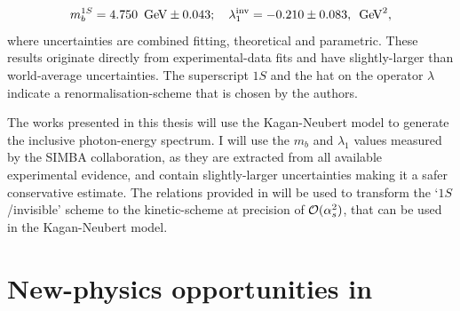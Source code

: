 \begin{equation}
    m_b^{1S} =4.750~\mathrm{\,Ge\kern -0.1em V} \pm 0.043;  \quad \lambda^{\mathrm{inv}}_1 = -0.210\pm0.083,~\mathrm{\,Ge\kern -0.1em V}^2, 
\end{equation}
where uncertainties are combined fitting, theoretical and parametric.
These results originate directly from experimental-data fits and have slightly-larger than world-average uncertainties.
The superscript $1S$ and the hat on the operator $\lambda$ indicate a renormalisation-scheme that is chosen by the authors.

The works presented in this thesis will use the Kagan-Neubert model to generate the inclusive photon-energy spectrum.
I will use the $m_b$ and $\lambda_1$ values measured by the SIMBA collaboration, as they are extracted from all available experimental evidence, and contain slightly-larger uncertainties making it a safer conservative estimate.
The relations provided in \cite{Ligeti:2008ac} will be used to transform the `$1S$/invisible' scheme to the kinetic-scheme at precision of ${\cal O}(\alpha_s^2)$, that can be used in the Kagan-Neubert model.


\section{New-physics opportunities in \texorpdfstring{\BtoXsdgamma}{B->Xsg}}

